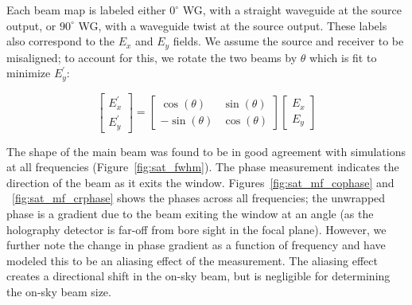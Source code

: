 Each beam map is labeled either $0^{\circ}$ WG, with a straight waveguide at the source output, or $90^{\circ}$ WG, with a waveguide twist at the source output.  These labels also correspond to the $E_x$ and $E_y$ fields.  We assume the source and receiver to be misaligned; to account for this, we rotate the two beams by $\theta$ which is fit to minimize $E_y^{'}$:

\begin{equation}
\begin{bmatrix}
 E_x^{'} \\
 E_y^{'}
 \end{bmatrix} = 
\begin{bmatrix}
 \cos(\theta) & \sin(\theta) \\
 -\sin(\theta) & \cos(\theta)
 \end{bmatrix}
\begin{bmatrix}
 E_x \\
 E_y
 \end{bmatrix}
 \end{equation}
 
The shape of the main beam was found to be in good agreement with simulations at all frequencies (Figure~\ref{fig:sat_fwhm}).  The phase measurement indicates the direction of the beam as it exits the window.  Figures~\ref{fig:sat_mf_cophase} and ~\ref{fig:sat_mf_crphase} shows the phases across all frequencies; the unwrapped phase is a gradient due to the beam exiting the window at an angle (as the holography detector is far-off from bore sight in the focal plane).  However, we further note the change in phase gradient as a function of frequency and have modeled this to be an aliasing effect of the measurement.  The aliasing effect creates a directional shift in the on-sky beam, but is negligible for determining the on-sky beam size.


